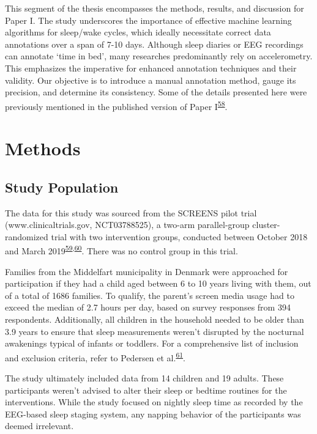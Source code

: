 \documentclass[
  9pt,
]{scrbook}
\begin{document}
This segment of the thesis encompasses the methods, results, and
discussion for Paper I. The study underscores the importance of
effective machine learning algorithms for sleep/wake cycles, which
ideally necessitate correct data annotations over a span of 7-10 days.
Although sleep diaries or EEG recordings can annotate `time in bed',
many researches predominantly rely on accelerometry. This emphasizes the
imperative for enhanced annotation techniques and their validity. Our
objective is to introduce a manual annotation method, gauge its
precision, and determine its consistency. Some of the details presented
here were previously mentioned in the published version of Paper
I\textsuperscript{\protect\hyperlink{ref-skovgaard_manual_2021}{58}}.

\hypertarget{methods}{%
\section{Methods}\label{methods}}

\hypertarget{study-population}{%
\subsection{Study Population}\label{study-population}}

The data for this study was sourced from the SCREENS pilot trial
(www.clinicaltrials.gov, NCT03788525), a two-arm parallel-group
cluster-randomized trial with two intervention groups, conducted between
October 2018 and March
2019\textsuperscript{\protect\hyperlink{ref-rasmussen_feasibility_2021}{59},\protect\hyperlink{ref-rasmussen_short-term_2020}{60}}.
There was no control group in this trial.

Families from the Middelfart municipality in Denmark were approached for
participation if they had a child aged between 6 to 10 years living with
them, out of a total of 1686 families. To qualify, the parent's screen
media usage had to exceed the median of 2.7 hours per day, based on
survey responses from 394 respondents. Additionally, all children in the
household needed to be older than 3.9 years to ensure that sleep
measurements weren't disrupted by the nocturnal awakenings typical of
infants or toddlers. For a comprehensive list of inclusion and exclusion
criteria, refer to Pedersen et
al.\textsuperscript{\protect\hyperlink{ref-pedersen_self-administered_2021}{61}}.

The study ultimately included data from 14 children and 19 adults. These
participants weren't advised to alter their sleep or bedtime routines
for the interventions. While the study focused on nightly sleep time as
recorded by the EEG-based sleep staging system, any napping behavior of
the participants was deemed irrelevant.
\end{document}
